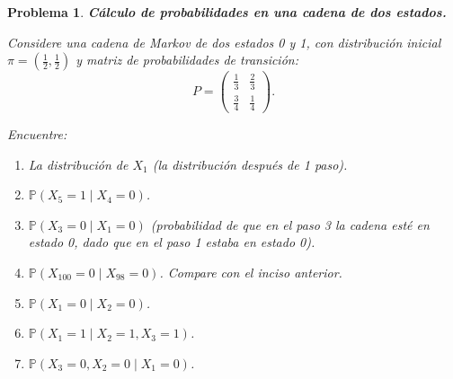 \documentclass[12pt]{article}
\newtheorem{problem}{Problema}
\begin{document}
\begin{problem}
\textbf{Cálculo de probabilidades en una cadena de dos estados.}

Considere una cadena de Markov de dos estados 0 y 1, con distribución inicial $\pi = \left(\frac{1}{2}, \frac{1}{2}\right)$ y matriz de probabilidades de transición:
\[
P = \begin{pmatrix}
\frac{1}{3} & \frac{2}{3} \\
\frac{3}{4} & \frac{1}{4}
\end{pmatrix}.
\]

Encuentre:

\begin{enumerate}
    \item[(a)] La distribución de $X_1$ (la distribución después de 1 paso).
    
    \item[(b)] $\mathbb{P}(X_5 = 1 \mid X_4 = 0)$.
    
    \item[(c)] $\mathbb{P}(X_3 = 0 \mid X_1 = 0)$ (probabilidad de que en el paso 3 la cadena esté en estado 0, dado que en el paso 1 estaba en estado 0).
    
    \item[(d)] $\mathbb{P}(X_{100} = 0 \mid X_{98} = 0)$. Compare con el inciso anterior.
    
    \item[(e)] $\mathbb{P}(X_1 = 0 \mid X_2 = 0)$.
    
    \item[(f)] $\mathbb{P}(X_1 = 1 \mid X_2 = 1, X_3 = 1)$.
    
    \item[(g)] $\mathbb{P}(X_3 = 0, X_2 = 0 \mid X_1 = 0)$.
\end{enumerate}
\end{problem}
\end{document}
